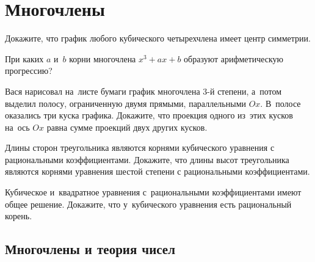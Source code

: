 
\section*{Многочлены}


\begin{problems}

\item
Докажите, что график любого кубического четырехчлена имеет центр симметрии.

\item
При каких $a$ и~$b$ корни многочлена $x^3 + a x + b$ образуют арифметическую
прогрессию?

\item
Вася нарисовал на~листе бумаги график многочлена $3$-й степени, а~потом выделил
полосу, ограниченную двумя прямыми, параллельными $Ox$.
В~полосе оказались три куска графика.
Докажите, что проекция одного из~этих кусков на~ось $Ox$ равна сумме проекций
двух других кусков.

\item
Длины сторон треугольника являются корнями кубического уравнения
с рациональными коэффициентами.
Докажите, что длины высот треугольника являются корнями уравнения шестой
степени с рациональными коэффициентами.

\item
Кубическое и~квадратное уравнения с~рациональными коэффициентами имеют общее
решение.
Докажите, что у~кубического уравнения есть рациональный корень.

\end{problems}

\subsection*{Многочлены и теория чисел}

